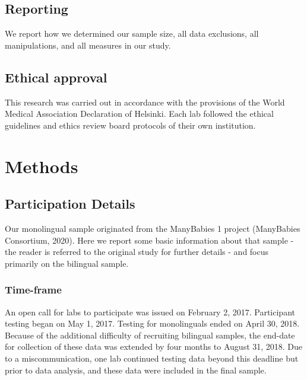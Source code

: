 \documentclass[
  english,
  ,man,floatsintext]{apa6}
\begin{document}
\hypertarget{reporting}{%
\subsection{Reporting}\label{reporting}}

We report how we determined our sample size, all data exclusions, all manipulations, and all measures in our study.

\hypertarget{ethical-approval}{%
\subsection{Ethical approval}\label{ethical-approval}}

This research was carried out in accordance with the provisions of the World Medical Association Declaration of Helsinki. Each lab followed the ethical guidelines and ethics review board protocols of their own institution.

\hypertarget{methods}{%
\section{Methods}\label{methods}}

\hypertarget{participation-details}{%
\subsection{Participation Details}\label{participation-details}}

Our monolingual sample originated from the ManyBabies 1 project (ManyBabies Consortium, 2020). Here we report some basic information about that sample - the reader is referred to the original study for further details - and focus primarily on the bilingual sample.

\hypertarget{time-frame}{%
\subsubsection{Time-frame}\label{time-frame}}

An open call for labs to participate was issued on February 2, 2017. Participant testing began on May 1, 2017. Testing for monolinguals ended on April 30, 2018. Because of the additional difficulty of recruiting bilingual samples, the end-date for collection of these data was extended by four months to August 31, 2018. Due to a miscommunication, one lab continued testing data beyond this deadline but prior to data analysis, and these data were included in the final sample.
\end{document}
